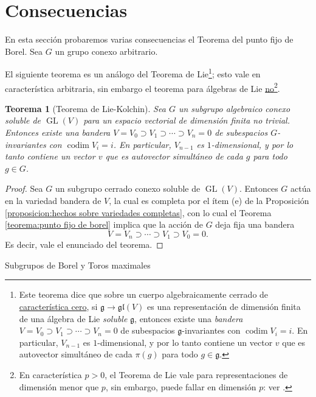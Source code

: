 \documentclass[spanish,12pt]{amsart}
\makeatletter
\renewcommand\subsection{\@startsection{subsection}{2}%
  \z@{.5\linespacing\@plus.7\linespacing}{-.5em}%
  {\normalfont\sffamily}}
\newtheorem{theorem}{Teorema}[section]
\theoremstyle{definition}
\theoremstyle{remark}
\numberwithin{equation}{section}
\makeatother
\begin{document}
\section{Consecuencias}

En esta sección probaremos varias consecuencias el Teorema del punto fijo de Borel. Sea $G$ un grupo conexo arbitrario.

El siguiente teorema es un análogo del Teorema de Lie\footnote{Este teorema dice que sobre un cuerpo algebraicamente cerrado de \underline{característica cero}, si $\mathfrak g \to \mathfrak {gl} (V)$ es una representación de dimensión finita de una álgebra de Lie \textit{soluble} $\mathfrak g$, entonces existe una \textit{bandera} $V = V_0 \supset V_1 \supset \cdots \supset V_n = 0$ de subespacios $\mathfrak g$-invariantes con $\operatorname{codim} V_i = i$. En particular, $V_{n-1}$ es $1$-dimensional, y por lo tanto contiene un vector $v$ que es autovector simultáneo de cada $\pi (g)$ para todo $g \in \mathfrak g$.}; esto vale en característica arbitraria, sin embargo el teorema para álgebras de Lie \underline{no}\footnote{En característica $p > 0$, el Teorema de Lie vale para representaciones de dimensión menor que $p$, sin embargo, puede fallar en dimensión $p$: ver \cite{wikipedia-lie-theorem}.}.
\begin{theorem}[Teorema de Lie-Kolchin]\label{teorema:Lie-Kolchin}
Sea $G$ un subgrupo algebraico conexo soluble de $\operatorname{GL} (V)$ para un espacio vectorial de dimensión finita no trivial. Entonces existe una bandera $V = V_0 \supset V_1 \supset \cdots \supset V_n = 0$ de subespacios $G$-invariantes con $\operatorname{codim} V_i = i$. En particular, $V_{n-1}$ es $1$-dimensional, y por lo tanto contiene un vector $v$ que es autovector simultáneo de cada $g$ para todo $g \in G$.
\end{theorem}
\begin{proof}
Sea $G$ un subgrupo cerrado conexo soluble de $\operatorname{GL} (V)$. Entonces $G$ actúa en la variedad bandera de $V$, la cual es completa por el ítem (e) de la Proposición \ref{proposicion:hechos sobre variedades completas}, con lo cual el Teorema \ref{teorema:punto fijo de borel} implica que la acción de $G$ deja fija una bandera
\[
    V = V_n \supset \cdots \supset V_1 \supset V_0 = 0.
\]
Es decir, vale el enunciado del teorema.
\end{proof}

\subsection{Subgrupos de Borel y Toros maximales}
\end{document}
